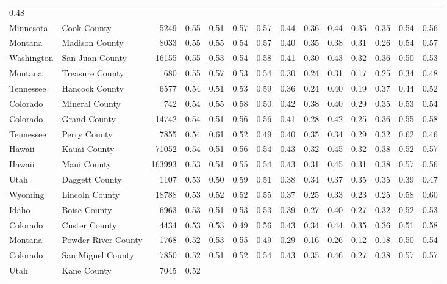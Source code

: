 \documentclass[10pt, letterpaper]{article}
\begin{document}
\begin{spacing}{1.4}
\begin{table}
{\begin{tabular}{llrrrrrrrrrrrr}
    0.48 \\ Minnesota & Cook County & 5249 & 0.55 & 0.51 & 0.57
    & 0.57 & 0.44 & 0.36 & 0.44 & 0.35 & 0.35 & 0.54
    & 0.56 \\ Montana & Madison County & 8033 & 0.55 & 0.55 &
    0.54 & 0.57 & 0.40 & 0.35 & 0.38 & 0.31 & 0.26 &
    0.54 & 0.57 \\ Washington & San Juan County & 16155 & 0.55 &
    0.53 & 0.54 & 0.58 & 0.41 & 0.30 & 0.43 & 0.32 &
    0.36 & 0.50 & 0.53 \\ Montana & Treasure County & 680 & 0.55
    & 0.57 & 0.53 & 0.54 & 0.30 & 0.24 & 0.31 & 0.17
    & 0.25 & 0.34 & 0.48 \\ Tennessee & Hancock County & 6577 &
    0.54 & 0.51 & 0.53 & 0.59 & 0.36 & 0.24 & 0.40 &
    0.19 & 0.37 & 0.44 & 0.52 \\ Colorado & Mineral County & 742
    & 0.54 & 0.55 & 0.58 & 0.50 & 0.42 & 0.38 & 0.40
    & 0.29 & 0.35 & 0.53 & 0.54 \\ Colorado & Grand County &
    14742 & 0.54 & 0.51 & 0.56 & 0.56 & 0.41 & 0.28 &
    0.42 & 0.25 & 0.36 & 0.55 & 0.58 \\ Tennessee & Perry
    County & 7855 & 0.54 & 0.61 & 0.52 & 0.49 & 0.40 &
    0.35 & 0.34 & 0.29 & 0.32 & 0.62 & 0.46 \\ Hawaii &
    Kauai County & 71052 & 0.54 & 0.51 & 0.56 & 0.54 & 0.43
    & 0.32 & 0.45 & 0.32 & 0.38 & 0.52 & 0.57 \\ Hawaii
    & Maui County & 163993 & 0.53 & 0.51 & 0.55 & 0.54 &
    0.43 & 0.31 & 0.45 & 0.31 & 0.38 & 0.57 & 0.56
    \\ Utah & Daggett County & 1107 & 0.53 & 0.50 & 0.59 & 0.51
    & 0.38 & 0.34 & 0.37 & 0.35 & 0.35 & 0.39 & 0.47
    \\ Wyoming & Lincoln County & 18788 & 0.53 & 0.52 & 0.52 &
    0.55 & 0.37 & 0.25 & 0.33 & 0.23 & 0.25 & 0.58 &
    0.60 \\ Idaho & Boise County & 6963 & 0.53 & 0.51 & 0.53 &
    0.53 & 0.39 & 0.27 & 0.40 & 0.27 & 0.32 & 0.52 &
    0.53 \\ Colorado & Custer County & 4434 & 0.53 & 0.53 & 0.49
    & 0.56 & 0.43 & 0.34 & 0.44 & 0.35 & 0.36 & 0.51
    & 0.58 \\ Montana & Powder River County & 1768 & 0.52 & 0.53 &
    0.55 & 0.49 & 0.29 & 0.16 & 0.26 & 0.12 & 0.18 &
    0.50 & 0.54 \\ Colorado & San Miguel County & 7850 & 0.52 &
    0.51 & 0.52 & 0.54 & 0.43 & 0.35 & 0.46 & 0.27 &
    0.38 & 0.57 & 0.57 \\ Utah & Kane County & 7045 & 0.52 &

\end{tabular}}
\end{table}
\end{spacing}
\end{document}
